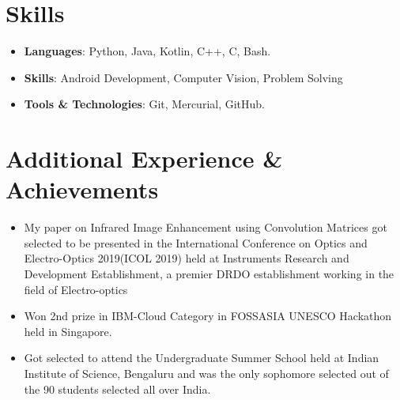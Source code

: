 \documentclass[letterpaper,11pt]{article}
\newcommand{\resumeSubHeadingListStart}{\begin{itemize}[leftmargin=*]}
\newcommand{\resumeSubHeadingListEnd}{\end{itemize}}
\newcommand{\shorterSection}[1]{\vspace{-10pt}\section{#1}}
\begin{document}
\shorterSection{Skills}
  \resumeSubHeadingListStart
  \small
    \item{\textbf{Languages}{: Python, Java, Kotlin, C++, C, Bash.}}
    \vspace{-4pt}
    \item{\textbf{Skills}{: Android Development, Computer Vision, Problem Solving}}
    \vspace{-5pt}
    \item{\textbf{Tools \& Technologies}{: Git, Mercurial, GitHub.}}
\resumeSubHeadingListEnd




\shorterSection{Additional Experience \& Achievements}
  \resumeSubHeadingListStart
  \small
    \item{My paper on Infrared Image Enhancement using Convolution Matrices got selected to be presented in the International Conference on Optics and Electro-Optics 2019(ICOL 2019) held at Instruments Research and Development Establishment, a premier DRDO establishment working in the field of Electro-optics}
    \vspace{-5pt}
    \item{Won 2nd prize in IBM-Cloud Category in FOSSASIA UNESCO Hackathon held in Singapore.}
    \vspace{-5pt}    
	\item{Got selected to attend the Undergraduate Summer School held at Indian Institute of Science, Bengaluru and was the only sophomore selected out of the 90 students selected all over India.}
  \resumeSubHeadingListEnd
\end{document}
